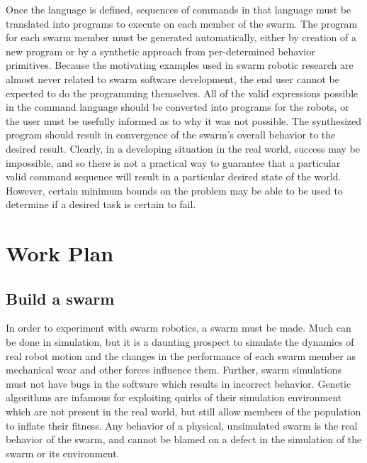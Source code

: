 \documentclass[]{article}
\begin{document}
Once the language is defined, sequences of commands in that language must be translated into programs to execute on each member of the swarm. 
The program for each swarm member must be generated automatically, either by creation of a new program or by a synthetic approach from per-determined behavior primitives.
Because the motivating examples used in swarm robotic research are almost never related to swarm software development, the end user cannot be expected to do the programming themselves. 
All of the valid expressions possible in the command language should be converted into programs for the robots, or the user must be usefully informed as to why it was not possible. 
The synthesized program should result in convergence of the swarm's overall behavior to the desired result. 
Clearly, in a developing situation in the real world, success may be impossible, and so there is not a practical way to guarantee that a particular valid command sequence will result in a particular desired state of the world. 
However, certain minimum bounds on the problem may be able to be used to determine if a desired task is certain to fail.


\section{Work Plan}

\subsection{Build a swarm}

In order to experiment with swarm robotics, a swarm must be made.
Much can be done in simulation, but it is a daunting prospect to simulate the dynamics of real robot motion and the changes in the performance of each swarm member as mechanical wear and other forces influence them. 
Further, swarm simulations must not have bugs in the software which results in incorrect behavior. 
Genetic algorithms are infamous for exploiting quirks of their simulation environment which are not present in the real world, but still allow members of the population to inflate their fitness. 
Any behavior of a physical, unsimulated swarm is the real behavior of the swarm, and cannot be blamed on a defect in the simulation of the swarm or its environment. 
\end{document}
